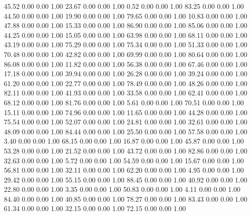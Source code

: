    45.52   0.00   0.00   1.00
   23.67   0.00   0.00   1.00
    0.52   0.00   0.00   1.00
   83.25   0.00   0.00   1.00
   44.50   0.00   0.00   1.00
   19.90   0.00   0.00   1.00
   79.65   0.00   0.00   1.00
   10.83   0.00   0.00   1.00
   47.88   0.00   0.00   1.00
   15.33   0.00   0.00   1.00
   86.90   0.00   0.00   1.00
   85.06   0.00   0.00   1.00
   44.25   0.00   0.00   1.00
   15.05   0.00   0.00   1.00
   63.98   0.00   0.00   1.00
   68.11   0.00   0.00   1.00
   43.19   0.00   0.00   1.00
   75.29   0.00   0.00   1.00
   75.34   0.00   0.00   1.00
   51.33   0.00   0.00   1.00
   70.48   0.00   0.00   1.00
   42.82   0.00   0.00   1.00
   69.99   0.00   0.00   1.00
   80.64   0.00   0.00   1.00
   86.08   0.00   0.00   1.00
   11.82   0.00   0.00   1.00
   56.38   0.00   0.00   1.00
   67.46   0.00   0.00   1.00
   17.18   0.00   0.00   1.00
   39.94   0.00   0.00   1.00
   26.28   0.00   0.00   1.00
   39.24   0.00   0.00   1.00
   61.20   0.00   0.00   1.00
   22.77   0.00   0.00   1.00
   78.49   0.00   0.00   1.00
   48.26   0.00   0.00   1.00
   82.11   0.00   0.00   1.00
   41.93   0.00   0.00   1.00
   33.58   0.00   0.00   1.00
   62.41   0.00   0.00   1.00
   68.12   0.00   0.00   1.00
   81.76   0.00   0.00   1.00
    5.61   0.00   0.00   1.00
   70.51   0.00   0.00   1.00
   15.11   0.00   0.00   1.00
   74.96   0.00   0.00   1.00
   11.65   0.00   0.00   1.00
   44.28   0.00   0.00   1.00
   75.54   0.00   0.00   1.00
   52.07   0.00   0.00   1.00
   24.81   0.00   0.00   1.00
   32.61   0.00   0.00   1.00
   48.09   0.00   0.00   1.00
   84.44   0.00   0.00   1.00
   25.50   0.00   0.00   1.00
   57.58   0.00   0.00   1.00
    3.40   0.00   0.00   1.00
   68.15   0.00   0.00   1.00
   16.87   0.00   0.00   1.00
   45.87   0.00   0.00   1.00
   53.28   0.00   0.00   1.00
   21.52   0.00   0.00   1.00
   43.72   0.00   0.00   1.00
   82.86   0.00   0.00   1.00
   32.63   0.00   0.00   1.00
    5.72   0.00   0.00   1.00
   54.59   0.00   0.00   1.00
   15.67   0.00   0.00   1.00
   56.81   0.00   0.00   1.00
   32.11   0.00   0.00   1.00
   62.20   0.00   0.00   1.00
    4.95   0.00   0.00   1.00
   29.42   0.00   0.00   1.00
   55.15   0.00   0.00   1.00
   88.45   0.00   0.00   1.00
   40.92   0.00   0.00   1.00
   22.80   0.00   0.00   1.00
    3.35   0.00   0.00   1.00
   50.83   0.00   0.00   1.00
    4.11   0.00   0.00   1.00
   84.40   0.00   0.00   1.00
   40.85   0.00   0.00   1.00
   78.27   0.00   0.00   1.00
   83.43   0.00   0.00   1.00
   61.34   0.00   0.00   1.00
   32.15   0.00   0.00   1.00
   72.15   0.00   0.00   1.00
